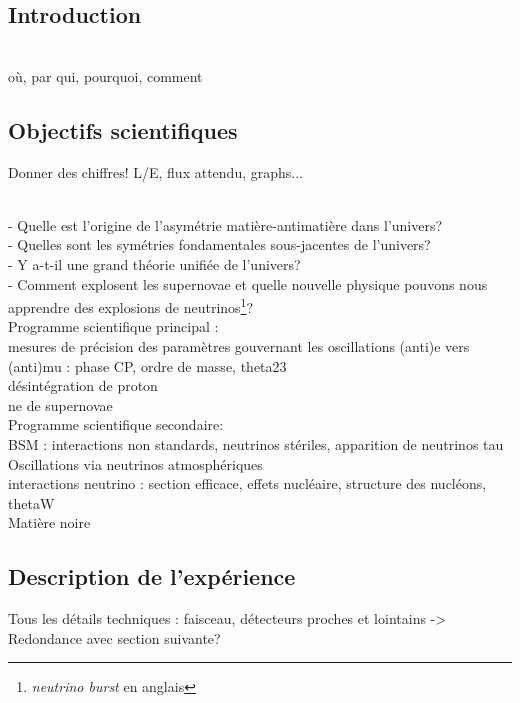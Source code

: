         \subsection{Introduction}
            \cite{Acciarri2016}\\
            où, par qui, pourquoi, comment

        \subsection{Objectifs scientifiques}
            Donner des chiffres! L/E, flux attendu, graphs...
        
            \cite{Collaboration2015}\\
            - Quelle est l'origine de l'asymétrie matière-antimatière dans l'univers?\\
            - Quelles sont les symétries fondamentales sous-jacentes de l'univers?\\
            - Y a-t-il une grand théorie unifiée de l'univers?\\
            - Comment explosent les supernovae et quelle nouvelle physique pouvons nous apprendre des explosions de neutrinos\footnote{\textit{neutrino burst} en anglais}?\\
            
            Programme scientifique principal :\\ mesures de précision des paramètres gouvernant les oscillations (anti)e vers (anti)mu : phase CP, ordre de masse, theta23\\
            désintégration de proton\\
            ne de supernovae\\
            
            Programme scientifique secondaire:\\
            BSM : interactions non standards, neutrinos stériles, apparition de neutrinos tau\\
            Oscillations via neutrinos atmosphériques\\
            interactions neutrino : section efficace, effets nucléaire, structure des nucléons, thetaW\\
            Matière noire
            
        
        \subsection{Description de l'expérience}
            Tous les détails techniques : faisceau, détecteurs proches et lointains
            -> Redondance avec section suivante?
    
